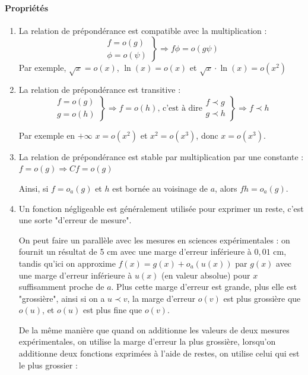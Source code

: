 \documentclass[]{article}
\begin{document}
\paragraph{Propriétés}
\begin{enumerate}
	\item La relation de prépondérance est compatible avec la multiplication : 
	$$\left. \begin{array}{c}
		f=o(g) \\
		\phi = o(\psi)
	\end{array} \right\} \Longrightarrow f \phi = o(g \psi)$$
	Par exemple, $\sqrt{x}=o(x)$, $\ln(x)=o(x)$ et $\sqrt{x} \cdot \ln(x)=o(x^2)$
	
	\newpage
	\item La relation de prépondérance est transitive : 
	$$\left. \begin{array}{c}
		f=o(g) \\
		g = o(h)
	\end{array} \right\} \Longrightarrow f = o(h) \text{, c'est à dire} \left. \begin{array}{c}
			f \prec g \\
			g \prec h
		\end{array} \right\} \Longrightarrow f \prec h
	$$

	Par exemple en $+ \infty$ $x=o(x^2)$ et $x^2=o(x^3)$, donc $x=o(x^3)$.
	
	\item La relation de prépondérance est stable par multiplication par une constante : $f=o(g) \Longrightarrow Cf = o(g)$
	
	Ainsi, si $f=o_a(g)$ et $h$ est bornée au voisinage de $a$, alors $fh=o_a(g)$.
	
	\item Un fonction négligeable est généralement utilisée pour exprimer un reste, c'est une sorte "d'erreur de mesure".
	
	On peut faire un parallèle avec les mesures en sciences expérimentales : on fournit un résultat de 5 cm avec une marge d'erreur inférieure à $0,01$ cm, tandis qu'ici on approxime $f(x)=g(x)+o_a(u(x))$ par $g(x)$ avec une marge d'erreur inférieure à $u(x)$ (en valeur absolue) pour $x$ suffisamment proche de $a$. Plus cette marge d'erreur est grande, plus elle est "grossière", ainsi si on a $u \prec v$, la marge d'erreur $o(v)$ est plus grossière que $o(u)$, et $o(u)$ est plus fine que $o(v)$.
	
	De la même manière que quand on additionne les valeurs de deux mesures expérimentales, on utilise la marge d'erreur la plus grossière, lorsqu'on additionne deux fonctions exprimées à l'aide de restes, on utilise celui qui est le plus grossier :
	

\end{enumerate}
\end{document}
